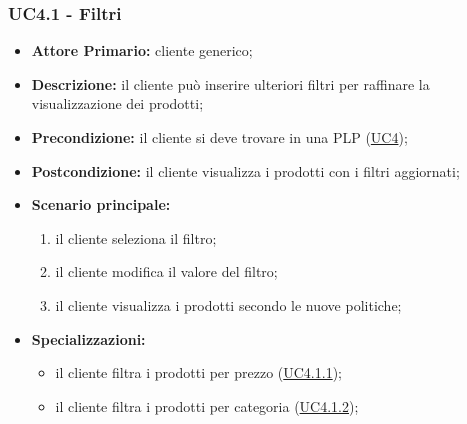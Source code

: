 \subsubsection{UC4.1 - Filtri}
\label{UC4.1}
\begin{itemize}
    \item \textbf{Attore Primario:} cliente generico;
    \item \textbf{Descrizione:} il cliente può inserire ulteriori filtri per raffinare la visualizzazione dei prodotti;
    \item \textbf{Precondizione:} il cliente si deve trovare in una PLP (\hyperref[UC4]{UC4});
    \item \textbf{Postcondizione:} il cliente visualizza i prodotti con i filtri aggiornati;
    \item \textbf{Scenario principale:}
    \begin{enumerate}
        \item il cliente seleziona il filtro;
        \item il cliente modifica il valore del filtro;
        \item il cliente visualizza i prodotti secondo le nuove politiche; 
    \end{enumerate}
    \item \textbf{Specializzazioni: }
    \begin{itemize}
        \item il cliente filtra i prodotti per prezzo (\hyperref[UC4.1.1]{UC4.1.1});
        \item il cliente filtra i prodotti per categoria (\hyperref[UC4.1.2]{UC4.1.2});
    \end{itemize}
\end{itemize}

